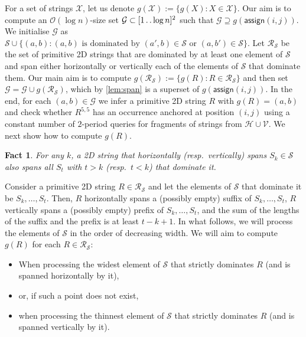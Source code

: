 \documentclass[11pt,letterpaper]{article}
\newcommand{\cO}{\mathcal{O}}
\def\dd{\mathinner{.\,.}}
\newcommand{\assign}{\textsf{assign}}
\renewcommand{\S}{\mathcal{S}}
\newcommand{\R}{\mathcal{R}_{\S}}
\newtheorem{fact}[theorem]{Fact}
\begin{document}
For a set of strings $\mathcal{X}$, let us denote $g(\mathcal{X}):=\{g(X) :X\in \mathcal{X}\}$.
Our aim is to compute an $\cO(\log n)$-size set $\mathcal{G} \subset [1\dd \log n]^2$ such that $\mathcal{G} \supseteq g(\assign(i,j))$.
We initialise $\mathcal{G}$ as $\mathcal{S} \cup \{(a,b): (a,b) \text{ is dominated by } (a',b) \in \mathcal{S} \text{ or } (a,b') \in \mathcal{S}\}$.
Let $\R$ be the set of primitive 2D strings that are dominated by at least one element of $\S$ and span either horizontally or vertically each of the elements of $\S$ that dominate them.
Our main aim is to compute $g(\R):=\{g(R) :R\in \R\}$ and then set $\mathcal{G} = \mathcal{G} \cup g(\R)$, which by \cref{lem:span} is a superset of $g(\assign(i,j))$.
In the end, for each $(a,b) \in \mathcal{G}$ we infer a primitive 2D string $R$ with $g(R)=(a,b)$ and check whether $R^{5,5}$ has an occurrence anchored at position $(i,j)$ using a constant number of $2$-period queries for fragments of strings from $\mathcal{H} \cup \mathcal{V}$.
We next show how to compute $g(R)$.

\begin{fact}
For any $k$, a 2D string that horizontally (resp.~vertically) spans $S_k \in \S$ also spans all $S_t$ with $t > k$ (resp.~$t<k$) that dominate it.
\end{fact}
Consider a primitive 2D string $R \in \R$ and let the elements of $\S$ that dominate it be $S_k, \ldots, S_t$.
Then, $R$ horizontally spans a (possibly empty) suffix of $S_k, \ldots, S_t$, $R$ vertically spans a (possibly empty) prefix of $S_k, \ldots, S_t$, and the sum of the lengths of the suffix and the prefix is at least $t-k+1$.
In what follows, we will process the elements of $\S$ in the order of decreasing width.
We will aim to compute $g(R)$ for each $R \in \R$:

\begin{itemize}
\item When processing the widest element of $\S$ that strictly dominates $R$ (and is spanned horizontally by it),
\item[] or, if such a point does not exist,
\item when processing the thinnest element of $\S$ that strictly dominates $R$ (and is spanned vertically by it).
\end{itemize}
\end{document}
